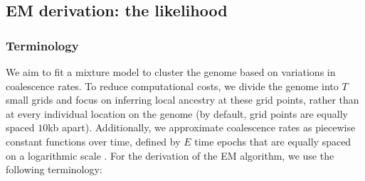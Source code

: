 \subsection{EM derivation: the likelihood}
\subsubsection{Terminology}
\label{terminology}
We aim to fit a mixture model to cluster the genome based on variations in coalescence rates. To reduce computational costs, we divide the genome into $T$ small grids and focus on inferring local ancestry at these grid points, rather than at every individual location on the genome (by default, grid points are equally spaced $10$kb apart). Additionally, we approximate coalescence rates as piecewise constant functions over time, defined by $E$ time epochs that are equally spaced on a logarithmic scale \cite{schiffels2014inferring}. For the derivation of the EM algorithm, we use the following terminology:
